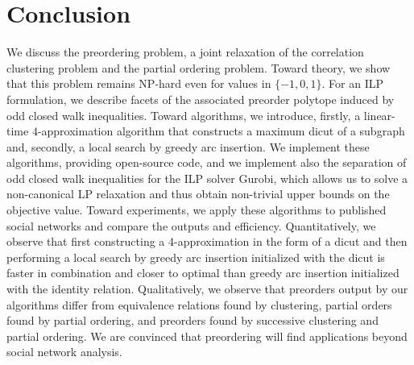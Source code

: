 \section{Conclusion}
\label{sec:conclusion}

We discuss the preordering problem, a joint relaxation of the correlation clustering problem and the partial ordering problem.
Toward theory, we show that this problem remains \textsc{NP}-hard even for values in $\{-1,0,1\}$.
For an ILP formulation, we describe facets of the associated preorder polytope induced by odd closed walk inequalities.
Toward algorithms, we introduce, firstly, a linear-time $4$-approximation algorithm that constructs a maximum dicut of a subgraph and, secondly, a local search by greedy arc insertion.
We implement these algorithms, providing open-source code, and we implement also the separation of odd closed walk inequalities for the ILP solver Gurobi, which allows us to solve a non-canonical LP relaxation and thus obtain non-trivial upper bounds on the objective value.
Toward experiments, we apply these algorithms to published social networks and compare the outputs and efficiency.
Quantitatively, we observe that first constructing a 4-approximation in the form of a dicut and then performing a local search by greedy arc insertion initialized with the dicut is faster in combination and closer to optimal than greedy arc insertion initialized with the identity relation.
Qualitatively, we observe that preorders output by our algorithms differ from equivalence relations found by clustering, partial orders found by partial ordering, and preorders found by successive clustering and partial ordering.
We are convinced that preordering will find applications beyond social network analysis.
